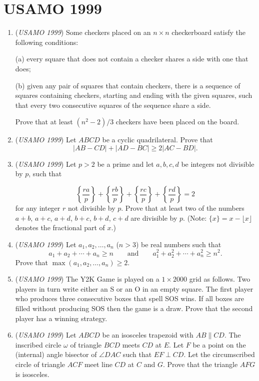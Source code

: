 \section{USAMO 1999}
        \begin{enumerate}
        	\item (\textit{USAMO 1999}) Some checkers placed on an $n\times n$ checkerboard satisfy the following conditions:


 (a) every square that does not contain a checker shares a side with one that does;


 (b) given any pair of squares that contain checkers, there is a sequence of squares containing checkers, starting and ending with the given squares, such that every two consecutive squares of the sequence share a side.


 Prove that at least $(n^{2}-2)/3$ checkers have been placed on the board.


 

	\item (\textit{USAMO 1999}) Let $ABCD$ be a cyclic quadrilateral. Prove that 
 \[|AB - CD| + |AD - BC| \geq 2|AC - BD|.\]


	\item (\textit{USAMO 1999}) Let $p > 2$ be a prime and let $a,b,c,d$ be integers not divisible by $p$, such that

 \[\left\{ \dfrac{ra}{p} \right\} + \left\{ \dfrac{rb}{p} \right\} + \left\{ \dfrac{rc}{p} \right\} + \left\{ \dfrac{rd}{p} \right\} = 2\]
for any integer $r$ not divisible by $p$. Prove that at least two of the numbers $a+b$, $a+c$, $a+d$, $b+c$, $b+d$, $c+d$ are divisible by $p$.
(Note: $\{x\} = x - \lfloor x \rfloor$ denotes the fractional part of $x$.)


 

	\item (\textit{USAMO 1999}) Let $a_{1}, a_{2}, \dots, a_{n}$ ($n > 3$) be real numbers such that 
 \[a_{1} + a_{2} + \cdots + a_{n} \geq n \qquad \mbox{and} \qquad a_{1}^{2} + a_{2}^{2} + \cdots + a_{n}^{2} \geq n^{2}.\] Prove that $\max(a_{1}, a_{2}, \dots, a_{n}) \geq 2$.


 

	\item (\textit{USAMO 1999}) The Y2K Game is played on a $1 \times 2000$ grid as follows. Two players in turn write either an S or an O in an empty square. The first player who produces three consecutive boxes that spell SOS wins. If all boxes are filled without producing SOS then the game is a draw. Prove that the second player has a winning strategy.


 

	\item (\textit{USAMO 1999}) Let $ABCD$ be an isosceles trapezoid with $AB \parallel CD$. The inscribed circle $\omega$ of triangle $BCD$ meets $CD$ at $E$. Let $F$ be a point on the (internal) angle bisector of $\angle DAC$ such that $EF \perp CD$. Let the circumscribed circle of triangle $ACF$ meet line $CD$ at $C$ and $G$. Prove that the triangle $AFG$ is isosceles.


 

\end{enumerate}